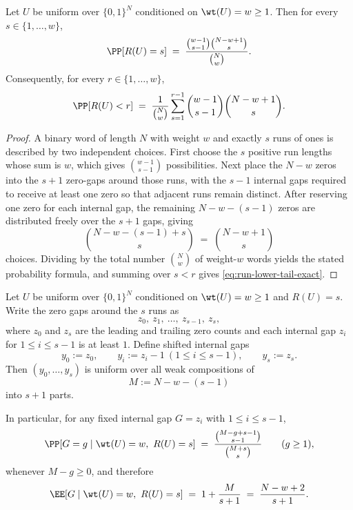 \begin{lemma}
\label{lem:run-count-distribution}
Let $U$ be uniform over $\{0,1\}^N$ conditioned on $\wt(U)=w\ge 1$.
Then for every $s\in\{1,\dots,w\}$,
\[
\PP[R(U)=s]
\;=\;
\frac{\binom{w-1}{s-1}\binom{N-w+1}{s}}{\binom{N}{w}}.
\]
Consequently, for every $r\in\{1,\dots,w\}$,
\begin{equation}
\label{eq:run-lower-tail-exact}
\PP[R(U)<r]
\;=\;
\frac{1}{\binom{N}{w}}
\sum_{s=1}^{r-1}
\binom{w-1}{s-1}\binom{N-w+1}{s}.
\end{equation}
\end{lemma}

\begin{proof}
A binary word of length $N$ with weight $w$ and exactly $s$ runs of ones is described by two independent choices.
First choose the $s$ positive run lengths whose sum is $w$, which gives $\binom{w-1}{s-1}$ possibilities.
Next place the $N-w$ zeros into the $s+1$ zero-gaps around those runs, with the $s-1$ internal gaps required to
receive at least one zero so that adjacent runs remain distinct.
After reserving one zero for each internal gap, the remaining $N-w-(s-1)$ zeros are distributed freely over the
$s+1$ gaps, giving
\[
\binom{N-w-(s-1)+s}{s}
\;=\;
\binom{N-w+1}{s}
\]
choices.
Dividing by the total number $\binom{N}{w}$ of weight-$w$ words yields the stated probability formula,
and summing over $s<r$ gives \eqref{eq:run-lower-tail-exact}.
\end{proof}

\begin{lemma}
\label{lem:gap-composition-given-runs}
Let $U$ be uniform over $\{0,1\}^N$ conditioned on $\wt(U)=w\ge 1$ and $R(U)=s$.
Write the zero gaps around the $s$ runs as
\[
z_0,\ z_1,\ \dots,\ z_{s-1},\ z_s,
\]
where $z_0$ and $z_s$ are the leading and trailing zero counts and each internal gap $z_i$ for
$1\le i\le s-1$ is at least $1$. Define shifted internal gaps
\[
y_0:=z_0,\qquad y_i:=z_i-1 \ (1\le i\le s-1),\qquad y_s:=z_s.
\]
Then $(y_0,\dots,y_s)$ is uniform over all weak compositions of
\[
M:=N-w-(s-1)
\]
into $s+1$ parts.

In particular, for any fixed internal gap $G=z_i$ with $1\le i\le s-1$,
\begin{equation}
\label{eq:internal-gap-marginal}
\PP[G=g \mid \wt(U)=w,\ R(U)=s]
\;=\;
\frac{\binom{M-g+s-1}{s-1}}{\binom{M+s}{s}}
\qquad (g\ge 1),
\end{equation}
whenever $M-g\ge 0$, and therefore
\begin{equation}
\label{eq:internal-gap-mean}
\EE[G \mid \wt(U)=w,\ R(U)=s]
\;=\;
1+\frac{M}{s+1}
\;=\;
\frac{N-w+2}{s+1}.
\end{equation}
\end{lemma}

